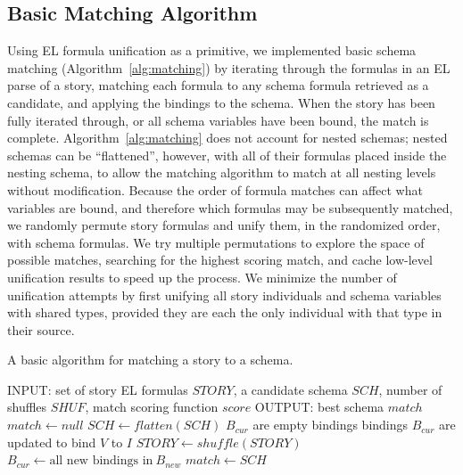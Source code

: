 \subsection{Basic Matching Algorithm}
Using EL formula unification as a primitive, we implemented basic schema matching (Algorithm~\ref{alg:matching}) by iterating through the formulas in an EL parse of a story, matching each formula to any schema formula retrieved as a candidate, and applying the bindings to the schema. When the story has been fully iterated through, or all schema variables have been bound, the match is complete.
Algorithm~\ref{alg:matching} does not account for nested schemas; nested schemas can be ``flattened'', however, with all of their formulas placed inside the nesting schema, to allow the matching algorithm to match at all nesting levels without modification.
Because the order of formula matches can affect what variables are bound, and therefore which formulas may be subsequently matched, we randomly permute story formulas and unify them, in the randomized order, with schema formulas.
We try multiple permutations to explore the space of possible matches, searching for the highest scoring match, and cache low-level unification results to speed up the process.
We minimize the number of unification attempts by first unifying all story individuals and schema variables with shared types, provided they are each the only individual with that type in their source.

\begin{algorithm}
\caption{A basic algorithm for matching a story to a schema.}
\label{alg:matching}
\begin{algorithmic}
\STATE INPUT: set of story EL formulas $STORY$, a candidate schema $SCH$, number of shuffles $SHUF$, match scoring function $score$
\STATE OUTPUT: best schema $match$
\STATE $match \gets null$
\STATE $SCH \gets flatten(SCH)$
\STATE $B_{cur}$ are empty bindings
            \STATE bindings $B_{cur}$ are updated to bind $V$ to $I$
        \ENDIF
    \ENDFOR
\ENDFOR
{}
    \STATE $STORY \gets shuffle(STORY)$
                \STATE $B_{cur} \gets \text{all new bindings in} \  B_{new}$
            \ENDIF
        \ENDFOR
    \ENDFOR
        \STATE $match \gets SCH$
    \ENDIF
\ENDFOR
\end{algorithmic}
\end{algorithm}


